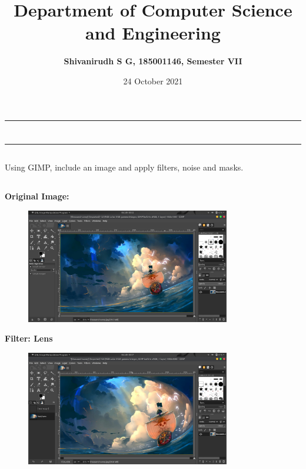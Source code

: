 \documentclass[9pt,letterpaper]{article}
\title{\textbf{Department of Computer Science and Engineering}}
\author{\textbf{Shivanirudh S G, 185001146, Semester VII }}
\date{24 October 2021}
\begin{document}
\maketitle
\hrule
\section*{}
\hrule 
\bigskip\bigskip

\subsection*{}

\subsection*{}
\begin{flushleft}
    Using GIMP, include an image and apply filters, noise and masks.
\end{flushleft}

\subsection*{}

\textbf{Original Image:}\\
\begin{figure}[h]
    \centering
    \includegraphics[height=5cm]{Outputs/OP1.png}
\end{figure}

\newpage
\textbf{Filter: Lens}\\
\begin{figure}[h]
    \centering
    \includegraphics[height=5cm]{Outputs/OP2.png}
\end{figure}
\end{document}
